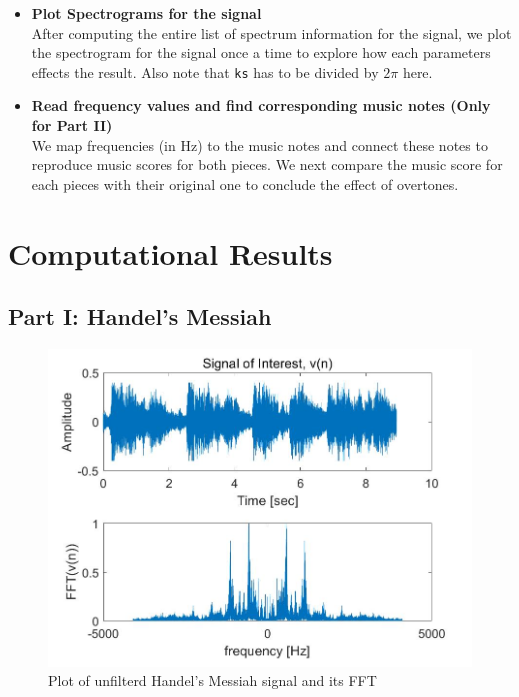 \documentclass[10pt,a4paper]{article}
\numberwithin{equation}{subsection}
\begin{document}
\begin{itemize}
\item \textbf{Plot Spectrograms for the signal}\\
After computing the entire list of spectrum information for the signal, we plot the spectrogram for the signal once a time to explore how each parameters effects the result. Also note that \texttt{ks} has to be divided by $2\pi$ here.

\item \textbf{Read frequency values and find corresponding music notes (Only for Part II)}\\
We map frequencies (in Hz) to the music notes and connect these notes to reproduce music scores for both pieces. We next compare the music score for each pieces with their original one to conclude the effect of overtones.

\end{itemize}


\section{Computational Results}
\subsection*{Part I: Handel's Messiah}
\begin{figure}[H]
\begin{center}
\includegraphics[scale=0.3]{f1.jpg}
\caption{Plot of unfilterd Handel's Messiah signal and its FFT}
\end{center}
\end{figure}
\end{document}
